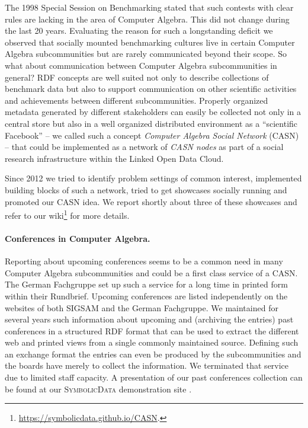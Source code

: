 \documentclass[12pt]{article}
\def\SD{\textsc{Sym\-bolic\-Data}}
\begin{document}
The 1998 Special Session on Benchmarking stated that such contests with clear
rules are lacking in the area of Computer Algebra. This did not change during
the last 20 years.  Evaluating the reason for such a longstanding deficit we
observed that socially mounted benchmarking cultures live in certain Computer
Algebra subcommunities but are rarely communicated beyond their scope. So
what about communication between Computer Algebra subcommunities in general?
RDF concepts are well suited not only to describe collections of benchmark data
but also to support communication on other scientific activities and
achievements between different subcommunities.  Properly organized metadata
generated by different stakeholders can easily be collected not only in a
central store but also in a well organized distributed environment as a
``scientific Facebook'' -- we called such a concept \emph{Computer Algebra
  Social Network} (CASN) \cite{cicm-14} -- that could be implemented as a
network of \emph{CASN nodes} as part of a social research infrastructure within
the Linked Open Data Cloud.

Since 2012 we tried to identify problem settings of common interest,
implemented building blocks of such a network, tried to get showcases socially
running and promoted our CASN idea.  We report shortly about three of these
showcases and refer to our
wiki\footnote{\url{https://symbolicdata.github.io/CASN}.} for more details.

\paragraph{Conferences in Computer Algebra.}
Reporting about upcoming conferences seems to be a common need in many Computer
Algebra subcommunities and could be a first class service of a CASN. The German
Fachgruppe set up such a service for a long time in printed form within their
Rundbrief.  Upcoming conferences are listed independently on the websites of
both SIGSAM and the German Fachgruppe.  We maintained for several years such
information about upcoming and (archiving the entries) past conferences in a
structured RDF format that can be used to extract the different web and printed
views from a single commonly maintained source.  Defining such an exchange
format the entries can even be produced by the subcommunities and the boards
have merely to collect the information.  We terminated that service due to
limited staff capacity. A presentation of our past conferences collection can
be found at our {\SD} demonstration site \cite{sdinfo}.
\end{document}
